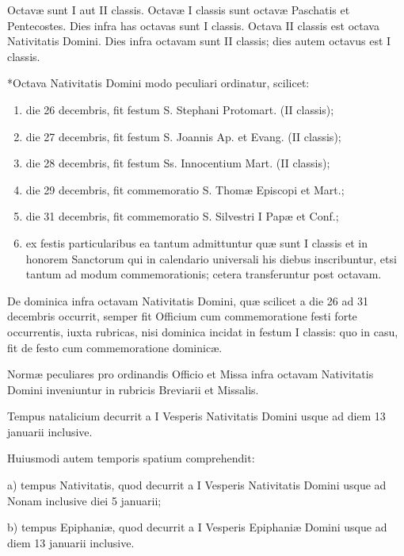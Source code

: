 \documentclass[vesperale_romanum.tex]{subfiles}
\begin{document}
Octavæ sunt I aut II classis. Octavæ I classis sunt octavæ Paschatis et Pentecostes. Dies infra has octavas sunt I classis. Octava II classis est octava Nativitatis Domini. Dies infra octavam sunt II classis; dies autem octavus est I classis.

*Octava Nativitatis Domini modo peculiari ordinatur, scilicet:
\begin{enumerate}[nosep,label=\alph*.]
\item die 26 decembris, fit festum S. Stephani Protomart. (II classis);

\item die 27 decembris, fit festum S. Joannis Ap. et Evang. (II classis);

\item die 28 decembris, fit festum Ss. Innocentium Mart. (II classis);

\item die 29 decembris, fit commemoratio S. Thomæ Episcopi et Mart.;

\item die 31 decembris, fit commemoratio S. Silvestri I Papæ et Conf.;

\item ex festis particularibus ea tantum admittuntur quæ sunt I classis et in honorem Sanctorum qui in calendario universali his diebus inscribuntur, etsi tantum ad modum commemorationis; cetera transferuntur post octavam.
\end{enumerate}

De dominica infra octavam Nativitatis Domini, quæ scilicet a die 26 ad 31 decembris occurrit, semper fit Officium cum commemoratione festi forte occurrentis, iuxta rubricas, nisi dominica incidat in festum I classis: quo in casu, fit de festo cum commemoratione dominicæ.

Normæ peculiares pro ordinandis Officio et Missa infra octavam Nativitatis Domini inveniuntur in rubricis Breviarii et Missalis.


Tempus natalicium decurrit a I Vesperis Nativitatis Domini usque ad diem 13 januarii inclusive.

Huiusmodi autem temporis spatium comprehendit:

a) tempus Nativitatis, quod decurrit a I Vesperis Nativitatis Domini usque ad Nonam inclusive diei 5 januarii;

b) tempus Epiphaniæ, quod decurrit a I Vesperis Epiphaniæ Domini usque ad diem 13 januarii inclusive.
\end{document}
